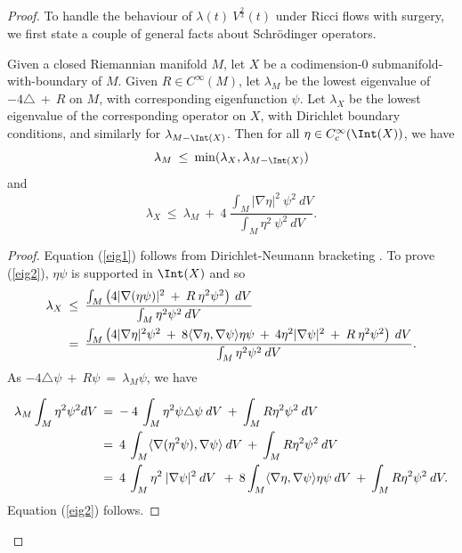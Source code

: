 \begin{proof}
To handle the behaviour of $\lambda(t) \: V^{\frac23}(t)$ under
Ricci flows with surgery, we
first state a couple of general facts about
Schr\"odinger operators.

\begin{lemma}
  \label{lem:kl-alternative-proof-cusp-incompressibility-estimates-spectral-geometry}
 \label{newprop1}
Given a closed Riemannian manifold $M$, let $X$ be a codimension-$0$
submanifold-with-boundary of $M$. Given $R \in C^\infty(M)$, let
$\lambda_M$ be the lowest eigenvalue of $-4\triangle \: + \: R$
on $M$, with corresponding eigenfunction $\psi$.
Let $\lambda_X$ be the lowest eigenvalue of the corresponding
operator on $X$, with Dirichlet boundary conditions, and similarly
for $\lambda_{M - \Int(X)}$. Then for all
$\eta \in C^\infty_c(\Int(X))$, we have
\begin{equation} \label{eig1}
\lambda_M \: \le \: \min(\lambda_X, \lambda_{M - \Int(X)})
\end{equation}
and
\begin{equation} \label{eig2}
\lambda_X \: \le \: \lambda_M \: + \: 4 \:
\frac{\int_M |\nabla \eta|^2 \: \psi^2 \: dV}{\int_M \eta^2 \:
\psi^2 \: dV}.
\end{equation}
\end{lemma}
\begin{proof}
Equation (\ref{eig1}) follows from Dirichlet-Neumann bracketing
\cite[Chapter XIII.15]{Reed-Simon}. To prove (\ref{eig2}),
$\eta \psi$ is supported in $\Int(X)$ and so
\begin{align}
\lambda_X \: & \le \: \frac{\int_M \left( 4 |\nabla(\eta \psi)|^2 \: + \:
R \: \eta^2 \psi^2 \right) \: dV}{\int_M \eta^2 \psi^2 \: dV} \\
& = \: \frac{\int_M \left( 4 |\nabla \eta|^2 \psi^2 \: + \:
8 \langle \nabla\eta, \nabla \psi \rangle \eta \psi \: + \:
4 \eta^2 |\nabla \psi|^2 \: + \:
R \: \eta^2 \psi^2 \right) \: dV}{\int_M \eta^2 \psi^2 \: dV}. \notag
\end{align}
As $- 4 \triangle \psi \: + \: R \psi \: = \: \lambda_M \psi$, we have

\begin{align}
\lambda_M \int_M \eta^2 \psi^2 dV \: & = \:
- \: 4 \: \int_M \eta^2 \psi \triangle \psi \: dV \: + \:
\int_M R \eta^2 \psi^2 \: dV \\
& = \:
4 \: \int_M \langle \nabla(\eta^2 \psi), \nabla \psi \rangle \: dV \:
+ \: \int_M R \eta^2 \psi^2 \: dV \notag \\
& = \: 4 \: \int_M \eta^2 \: |\nabla \psi|^2 \: dV \: \: + \:
8 \int_M \langle \nabla\eta, \nabla \psi \rangle \eta \psi \: dV
\: + \: \int_M R \eta^2 \psi^2 \: dV. \notag
\end{align}
Equation (\ref{eig2}) follows.
\end{proof}


\end{proof}
